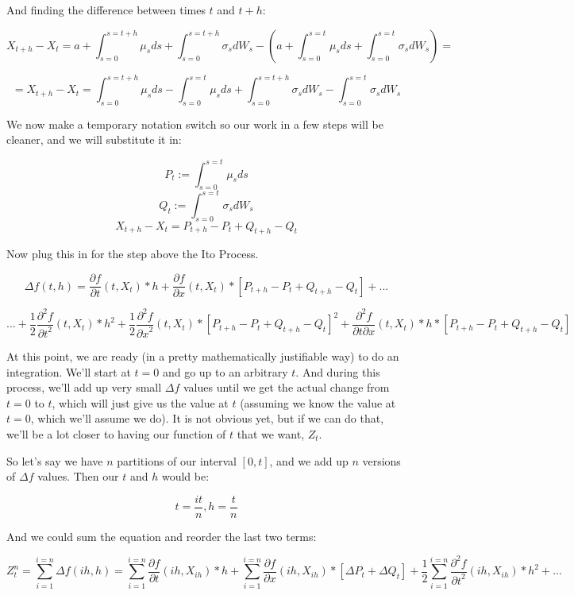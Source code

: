 \documentclass{article}
\begin{document}
And finding the difference between times $t$ and $t+h$:

$$X_{t+h} - X_t = a + \int_{s=0}^{s=t+h} \mu_sds + \int_{s=0}^{s=t+h} \sigma_sdW_s - \left(a + \int_{s=0}^{s=t} \mu_sds + \int_{s=0}^{s=t} \sigma_sdW_s\right) = $$

$$ =  X_{t+h} - X_t = \int_{s=0}^{s=t+h} \mu_sds - \int_{s=0}^{s=t} \mu_sds+ \int_{s=0}^{s=t+h} \sigma_sdW_s - \int_{s=0}^{s=t} \sigma_sdW_s$$

We now make a temporary notation switch so our work in a few steps will be cleaner, and we will substitute it in:

$$P_t := \int_{s=0}^{s=t} \mu_sds$$
$$Q_t := \int_{s=0}^{s=t} \sigma_sdW_s$$
$$  X_{t+h} - X_t = P_{t+h} -P_t+ Q_{t+h} - Q_t$$

Now plug this in for the step above the Ito Process. 

$$\Delta f(t,h) = \frac{\partial f}{\partial t}(t,X_{t}) *h + \frac{\partial f}{\partial x}(t,X_{t}) *[P_{t+h} -P_t+ Q_{t+h} - Q_t]  + ... $$

$$... +  \frac{1}{2}\frac{\partial^2 f}{{\partial t}^2}(t,X_{t}) * {h}^2 + \frac{1}{2}\frac{\partial^2 f}{{\partial x}^2}(t,X_{t}) * {[P_{t+h} -P_t+ Q_{t+h} - Q_t]}^2 +  \frac{\partial^2 f}{\partial t \partial x}(t,X_{t}) *h*[P_{t+h} -P_t+ Q_{t+h} - Q_t]$$

At this point, we are ready (in a pretty mathematically justifiable way) to do an integration. We'll start at $t=0$ and go up to an arbitrary $t$.  And during this process, we'll add up very small $\Delta f$ values until we get the actual change from $t=0$ to $t$, which will just give us the value at $t$ (assuming we know the value at $t=0$, which we'll assume we do).  It is not obvious yet, but if we can do that, we'll be a lot closer to having our function of $t$ that we want, $Z_t$. 

So let's say we have $n$ partitions of our interval $[0,t]$, and we add up $n$ versions of $\Delta f$ values.  Then our $t$ and $h$ would be:

$$t = \frac{it}{n}, h = \frac{t}{n}$$

And we could sum the equation and reorder the last two terms:

$$Z_t^n = \sum_{i=1}^{i = n} \Delta f\left(ih,h\right) = \sum_{i=1}^{i = n} \frac{\partial f}{\partial t}(ih,X_{ih}) *h + \sum_{i=1}^{i = n}\frac{\partial f}{\partial x}(ih,X_{ih}) *[\Delta P_t+ \Delta Q_t] +  \frac{1}{2}\sum_{i=1}^{i = n}\frac{\partial^2 f}{{\partial t}^2}(ih,X_{ih}) * {h}^2 + ... $$
\end{document}
